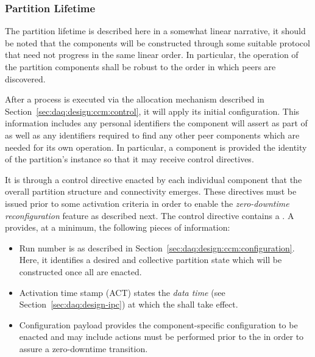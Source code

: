 \subsubsection{Partition Lifetime}
\label{sec:daq:partition-lifetime}

The partition lifetime is described here in a somewhat linear narrative, it should be noted that the components will be constructed through some suitable protocol that need not progress in the same linear order. 
In particular, the operation of the partition components shall be robust to the order in which peers are discovered.

After a process is executed via the allocation mechanism described in Section~\ref{sec:daq:design:ccm:control}, it will apply its initial configuration. 
This information includes any personal identifiers the component will assert as part of  as well as any identifiers required to find any other peer components which are needed for its own operation. 
In particular, a component is provided the identity of the partition's  instance so that it may receive control directives.

It is through a control directive enacted by each individual component that the overall partition structure and connectivity emerges.  
These directives must be issued prior to some activation criteria in order to enable the \textit{zero-downtime reconfiguration} feature as described next.
The control directive contains a .
A  provides, at a minimum, the following pieces of information:

\begin{itemize}
\item Run number is as described in Section~\ref{sec:daq:design:ccm:configuration}. 
  Here, it identifies a desired and collective partition state which will be constructed once all  are enacted.
\item Activation time stamp (ACT) states the \textit{data time} (see Section~\ref{sec:daq:design-ipc}) at which the  shall take effect. 
\item Configuration payload provides the component-specific configuration to be enacted and may include   actions must be performed prior to the  in order to assure a zero-downtime transition.
\end{itemize}

